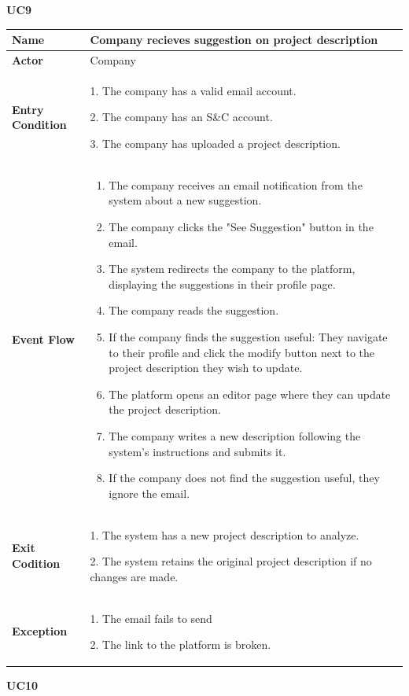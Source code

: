 \textbf{UC9}
\begin{longtable}{|p{}|p{}|}
\hline
\textbf{Name} &  Company recieves suggestion on project description\\
\hline
\textbf{Actor} &  Company\\
\hline
\textbf{Entry Condition} &  
1. The company has a valid email account.

2. The company has an S\&C account.

3. The company has uploaded a project description.\\
\hline
\textbf{Event Flow} &  
\begin{enumerate}
    \item The company receives an email notification from the system about a new suggestion.
    \item The company clicks the "See Suggestion" button in the email.
    \item The system redirects the company to the platform, displaying the suggestions in their profile page.
    \item The company reads the suggestion.
    \item  If the company finds the suggestion useful: They navigate to their profile and click the modify button next to the project description they wish to update.
    \item The platform opens an editor page where they can update the project description.
    \item The company writes a new description following the system’s instructions and submits it.
    \item If the company does not find the suggestion useful, they ignore the email.
\end{enumerate}\\
\hline
\textbf{Exit Codition} &  
1. The system has a new project description to analyze.

2. The system retains the original project description if no changes are made.\\
\hline
\textbf{Exception} &  
1. The email fails to send

2. The link to the platform is broken.\\
\hline
\end{longtable}

\textbf{UC10}

